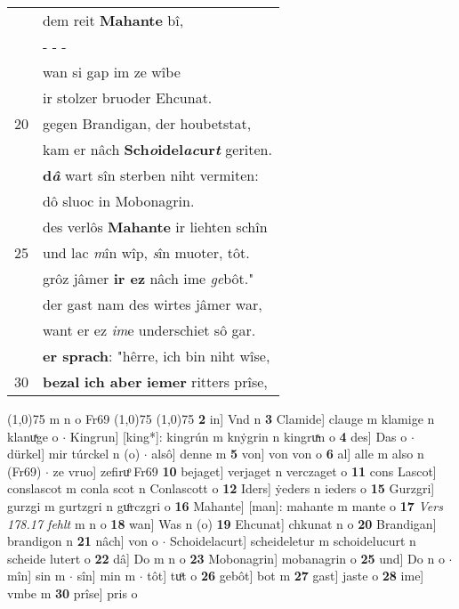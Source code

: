 \documentclass[8pt,a4paper,notitlepage]{article}
\begin{document}
\begin{table}[ht]
\begin{minipage}[t]{0.5\linewidth}
\begin{tabular}{rl}
 & dem reit \textbf{Mahante} bî,\\ 
 & \multicolumn{1}{l}{ - - - }\\ 
 & wan si gap im ze wîbe\\ 
 & ir stolzer bruoder Ehcunat.\\ 
20 & gegen Brandigan, der houbetstat,\\ 
 & kam er nâch \textbf{Sch\textit{o}idel\textit{ac}ur\textit{t}} geriten.\\ 
 & \textbf{d\textit{â}} wart sîn sterben niht vermiten:\\ 
 & dô sluoc in Mobonagrin.\\ 
 & des verlôs \textbf{Mahante} ir liehten schîn\\ 
25 & und lac \textit{m}în wîp, \textit{s}în muoter, tôt.\\ 
 & grôz jâmer \textbf{ir ez} nâch ime \textit{ge}bôt."\\ 
 & der gast nam des wirtes jâmer war,\\ 
 & want er ez \textit{im}e underschiet sô gar.\\ 
 & \textbf{er sprach}: "hêrre, ich bin niht wîse,\\ 
30 & \textbf{bezal} \textbf{ich aber} \textbf{iemer} ritters prîse,\\ 
\end{tabular}
\scriptsize
\line(1,0){75} \newline
m n o Fr69 \newline
\line(1,0){75} \newline
\newline
\line(1,0){75} \newline
\textbf{2} in] Vnd n \textbf{3} Clamide] clauge m klamige n klanuͯge o  $\cdot$ Kingrun] [king*]: kingrún m knẏgrin n kingruͯn o \textbf{4} des] Das o  $\cdot$ dürkel] mir túrckel n (o)  $\cdot$ alsô] denne m \textbf{5} von] von von o \textbf{6} al] alle m also n (Fr69)  $\cdot$ ze vruo] zefiruͦ Fr69 \textbf{10} bejaget] verjaget n verczaget o \textbf{11} cons Lascot] conslascot m conla scot n Conlascott o \textbf{12} Iders] ẏeders n ieders o \textbf{15} Gurzgri] gurzgi m gurtzgri n guͦrczgri o \textbf{16} Mahante] [man]: mahante m mante o \textbf{17} \textit{Vers 178.17 fehlt} m n o  \textbf{18} wan] Was n (o) \textbf{19} Ehcunat] chkunat n o \textbf{20} Brandigan] brandigon n \textbf{21} nâch] von o  $\cdot$ Schoidelacurt] scheideletur m schoidelucurt n scheide lutert o \textbf{22} dâ] Do m n o \textbf{23} Mobonagrin] mobanagrin o \textbf{25} und] Do n o  $\cdot$ mîn] sin m  $\cdot$ sîn] min m  $\cdot$ tôt] tuͦt o \textbf{26} gebôt] bot m \textbf{27} gast] jaste o \textbf{28} ime] vmbe m \textbf{30} prîse] pris o \newline
\end{minipage}
\end{table}
\end{document}
